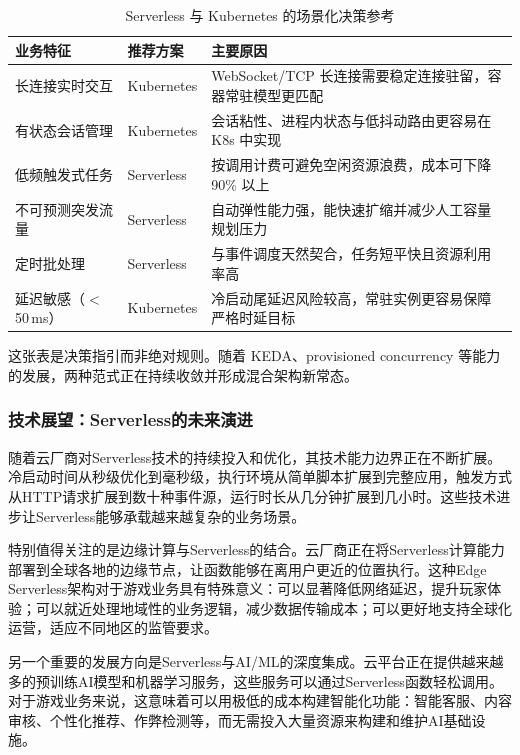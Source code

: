 \begin{table}[htbp]
\centering
\caption{Serverless 与 Kubernetes 的场景化决策参考}
\label{tab:serverless-k8s-decision}
\begin{tabular}{|p{}|p{}|p{}|}
\hline
业务特征 & 推荐方案 & 主要原因 \\
\hline
长连接实时交互 & Kubernetes & WebSocket/TCP 长连接需要稳定连接驻留，容器常驻模型更匹配 \\
\hline
有状态会话管理 & Kubernetes & 会话粘性、进程内状态与低抖动路由更容易在 K8s 中实现 \\
\hline
低频触发式任务 & Serverless & 按调用计费可避免空闲资源浪费，成本可下降 90\% 以上 \\
\hline
不可预测突发流量 & Serverless & 自动弹性能力强，能快速扩缩并减少人工容量规划压力 \\
\hline
定时批处理 & Serverless & 与事件调度天然契合，任务短平快且资源利用率高 \\
\hline
延迟敏感（$<$50\,ms） & Kubernetes & 冷启动尾延迟风险较高，常驻实例更容易保障严格时延目标 \\
\hline
\end{tabular}
\end{table}

这张表是决策指引而非绝对规则。随着 KEDA、provisioned concurrency 等能力的发展，两种范式正在持续收敛并形成混合架构新常态。

\subsubsection{技术展望：Serverless的未来演进}

随着云厂商对Serverless技术的持续投入和优化，其技术能力边界正在不断扩展。冷启动时间从秒级优化到毫秒级，执行环境从简单脚本扩展到完整应用，触发方式从HTTP请求扩展到数十种事件源，运行时长从几分钟扩展到几小时。这些技术进步让Serverless能够承载越来越复杂的业务场景。

特别值得关注的是边缘计算与Serverless的结合。云厂商正在将Serverless计算能力部署到全球各地的边缘节点，让函数能够在离用户更近的位置执行。这种Edge Serverless架构对于游戏业务具有特殊意义：可以显著降低网络延迟，提升玩家体验；可以就近处理地域性的业务逻辑，减少数据传输成本；可以更好地支持全球化运营，适应不同地区的监管要求。

另一个重要的发展方向是Serverless与AI/ML的深度集成。云平台正在提供越来越多的预训练AI模型和机器学习服务，这些服务可以通过Serverless函数轻松调用。对于游戏业务来说，这意味着可以用极低的成本构建智能化功能：智能客服、内容审核、个性化推荐、作弊检测等，而无需投入大量资源来构建和维护AI基础设施。

